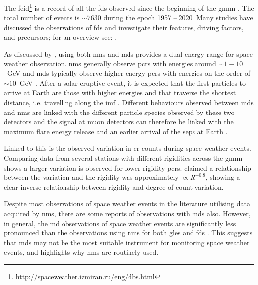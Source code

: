 The \gls{feid}\footnote{\url{http://spaceweather.izmiran.ru/eng/dbs.html}} is a record of all the \glspl{fd} observed since the beginning of the \gls{gnmn} \citep{belov_forbush_2008}. The total number of events is $\sim 7630$ during the epoch 1957 -- 2020. Many studies have discussed the observations of \glspl{fd} and investigate their features, driving factors, and precursors; for an overview see: \citet{belov_what_2001, usoskin_forbush_2008, wawrzynczak_modeling_2010, rockenbach_global_2014, arunbabu_how_2015}.


As discussed by \citet{kuwabara_real-time_2006}, using both \glspl{nm} and \glspl{md} provides a dual energy range for space weather observation. \glspl{nm} generally observe \glspl{pcr} with energies around $\sim 1 - 10$~GeV and \glspl{md} typically observe higher energy \glspl{pcr} with energies on the order of $\sim 10$~GeV \citep{kuwabara_real-time_2006, rockenbach_global_2014}. After a solar eruptive event, it is expected that the first particles to arrive at Earth are those with higher energies and that traverse the shortest distance, i.e. travelling along the \gls{imf} \citep{kuwabara_real-time_2006}. Different behaviours observed between \glspl{md} and \glspl{nm} are linked with the different particle species observed by these two detectors and the signal at muon detectors can therefore be linked with the maximum flare energy release and an earlier arrival of the \glspl{sep} at Earth \citep{kuwabara_real-time_2006}. 

Linked to this is the observed variation in \gls{cr} counts during space weather events. Comparing data from several stations with different rigidities across the \gls{gnmn} shows a larger variation is observed for lower rigidity \glspl{pcr}. \citet{belov_solar_2005} claimed a relationship between the variation and the rigidity was approximately $\propto R^{-0.8}$, showing a clear inverse relationship between rigidity and degree of count variation.

Despite most observations of space weather events in the literature utilising data acquired by \glspl{nm}, there are some reports of observations with \glspl{md} also. However, in general, the \gls{md} observations of space weather events are significantly less pronounced than the observations using \glspl{nm} for both \glspl{gle} \citep{timashkov_ground_2008, augusto_signals_2016} and \glspl{fd} \citep{braun_forbush_2009, rockenbach_global_2014}. This suggests that \glspl{md} may not be the most suitable instrument for monitoring space weather events, and highlights why \glspl{nm} are routinely used.

